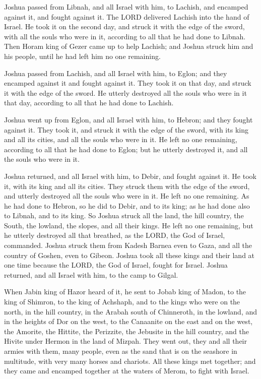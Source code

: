 \myverse{}Joshua passed from Libnah, and all Israel with him, to Lachish,
and encamped against it, and fought against it.
\myverse{}The LORD delivered Lachish into the hand of Israel. He took it on the second
day, and struck it with the edge of the sword, with all the souls who were in it, according to all that
he had done to Libnah.
\myverse{}Then Horam king of Gezer came up to help Lachish; and Joshua struck him and
his people, until he had left him no one remaining.

\myverse{}Joshua passed from Lachish, and all Israel with him, to Eglon;
and they encamped against it and fought against it.
\myverse{}They took it on that day, and struck it with the edge of the sword. He utterly
destroyed all the souls who were in it that day, according to all that he had done to Lachish.

\myverse{}Joshua went up from Eglon, and all Israel with him, to Hebron;
and they fought against it.
\myverse{}They took it, and struck it with the edge of the sword, with its king and
all its cities, and all the souls who were in it. He left no one remaining, according to all that he had
done to Eglon; but he utterly destroyed it, and all the souls who were in it.

\myverse{}Joshua returned, and all Israel with him, to Debir, and fought
against it.
\myverse{}He took it, with its king and all its cities. They struck them with the edge
of the sword, and utterly destroyed all the souls who were in it. He left no one remaining. As he had
done to Hebron, so he did to Debir, and to its king; as he had done also to Libnah, and to its king.
\myverse{}So Joshua struck all the land, the hill country, the South, the lowland,
the slopes, and all their kings. He left no one remaining, but he utterly destroyed all that breathed,
as the LORD, the God of Israel, commanded.
\myverse{}Joshua struck them from Kadesh Barnea even to Gaza, and all the country of
Goshen, even to Gibeon.
\myverse{}Joshua took all these kings and their land at one time because the LORD,
the God of Israel, fought for Israel.
\myverse{}Joshua returned, and all Israel with him, to the camp to Gilgal.


\mychapter{} \myverse*{}When Jabin king of Hazor heard of it, he sent to Jobab king of
Madon, to the king of Shimron, to the king of Achshaph,
\myverse{}and to the kings who were on the north, in the hill country, in the Arabah
south of Chinneroth, in the lowland, and in the heights of Dor on the west,
\myverse{}to the Canaanite on the east and on the west, the Amorite, the Hittite, the
Perizzite, the Jebusite in the hill country, and the Hivite under Hermon in the land of Mizpah.
\myverse{}They went out, they and all their armies with them, many people, even as the
sand that is on the seashore in multitude, with very many horses and chariots.
\myverse{}All these kings met together; and they came and encamped together at the waters
of Merom, to fight with Israel.

